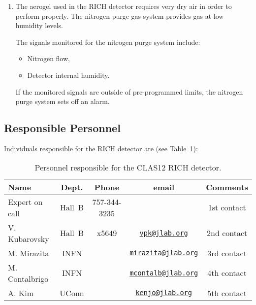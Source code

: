 \begin{enumerate}
\item The aerogel used in the RICH detector requires very dry air in order to perform properly. The 
nitrogen purge gas system provides gas  at low humidity levels.

The signals monitored for the nitrogen purge system include:
\begin{itemize}
\item Nitrogen flow,
\item Detector internal humidity.
\end{itemize}
If the monitored signals are outside of pre-programmed limits, the nitrogen purge system sets off 
an alarm.
\end{enumerate}

\subsection{Responsible Personnel}

Individuals responsible for the RICH detector are (see Table~\ref{tb:rich}):

\begin{table}[!htb]
\centering
\begin{tabular}{|l|c|c|c|c|} \hline
Name&Dept.&Phone&email&Comments \\ \hline
Expert on call & Hall~B & 757-344-3235 & & 1st contact \\ \hline
V. Kubarovsky  & Hall~B & x5649&\href{mailto:vpk@jlab.org}{\nolinkurl{vpk@jlab.org}}&2nd contact \\ \hline
M. Mirazita    & INFN   & &\href{mailto:mirazita@jlab.org}{\nolinkurl{mirazita@jlab.org}}& 3rd contact \\ \hline
M. Contalbrigo & INFN   & &\href{mailto:mcontalb@jlab.org}{\nolinkurl{mcontalb@jlab.org}}& 4th contact \\ \hline
A. Kim         & UConn  & &\href{mailto:kenjo@jlab.org}{\nolinkurl{kenjo@jlab.org}}& 5th contact \\ \hline
 \end{tabular}
\caption{Personnel responsible for the CLAS12 RICH detector.} 
\label{tb:rich}
\end{table}

